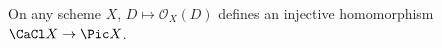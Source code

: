 On any scheme $X$, $D\mapsto \mathcal{O}_X(D)$ defines an injective homomorphism
$\CaCl X\to \Pic X$.
